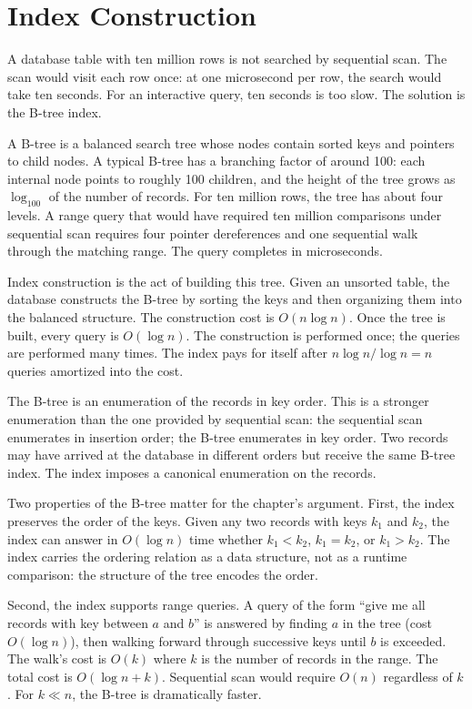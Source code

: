 \section{Index Construction}
\label{se:index-construction}

A database table with ten million rows is not searched by sequential scan. The
scan would visit each row once: at one microsecond per row, the search would
take ten seconds. For an interactive query, ten seconds is too slow. The
solution is the B-tree index.

A B-tree is a balanced search tree whose nodes contain sorted keys and pointers
to child nodes. A typical B-tree has a branching factor of around 100: each
internal node points to roughly 100 children, and the height of the tree grows
as $\log_{100}$ of the number of records. For ten million rows, the tree has
about four levels. A range query that would have required ten million
comparisons under sequential scan requires four pointer dereferences and one
sequential walk through the matching range. The query completes in
microseconds.

Index construction is the act of building this tree. Given an unsorted table,
the database constructs the B-tree by sorting the keys and then organizing
them into the balanced structure. The construction cost is $O(n \log n)$. Once
the tree is built, every query is $O(\log n)$. The construction is performed
once; the queries are performed many times. The index pays for itself after
$n \log n / \log n = n$ queries amortized into the cost.

The B-tree is an enumeration of the records in key order. This is a stronger
enumeration than the one provided by sequential scan: the sequential scan
enumerates in insertion order; the B-tree enumerates in key order. Two records
may have arrived at the database in different orders but receive the same
B-tree index. The index imposes a canonical enumeration on the records.

Two properties of the B-tree matter for the chapter's argument. First, the
index preserves the order of the keys. Given any two records with keys $k_1$
and $k_2$, the index can answer in $O(\log n)$ time whether $k_1 < k_2$,
$k_1 = k_2$, or $k_1 > k_2$. The index carries the ordering relation as a
data structure, not as a runtime comparison: the structure of the tree
encodes the order.

Second, the index supports range queries. A query of the form ``give me all
records with key between $a$ and $b$'' is answered by finding $a$ in the tree
(cost $O(\log n)$), then walking forward through successive keys until $b$ is
exceeded. The walk's cost is $O(k)$ where $k$ is the number of records in the
range. The total cost is $O(\log n + k)$. Sequential scan would require
$O(n)$ regardless of $k$. For $k \ll n$, the B-tree is dramatically faster.

